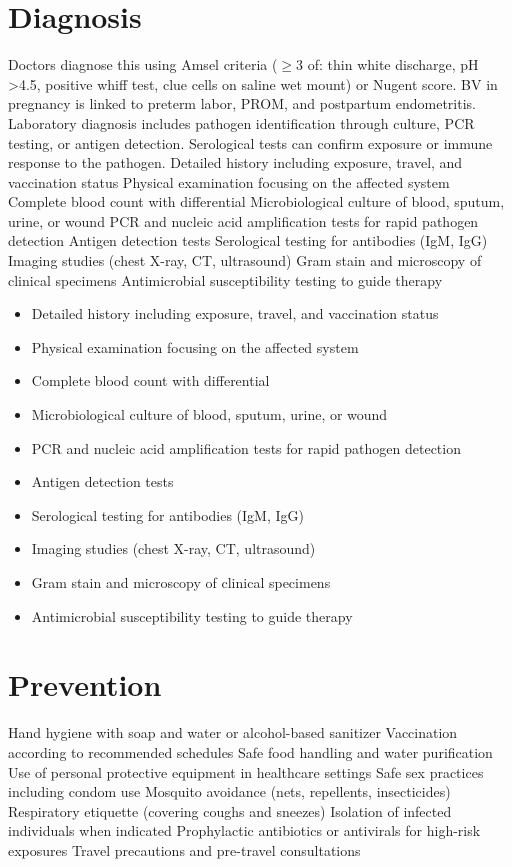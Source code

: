 \section{Diagnosis}
Doctors diagnose this using Amsel criteria ($\ge$3 of: thin white discharge, pH >4.5, positive whiff test, clue cells on saline wet mount) or Nugent score. BV in pregnancy is linked to preterm labor, PROM, and postpartum endometritis. Laboratory diagnosis includes pathogen identification through culture, PCR testing, or antigen detection. Serological tests can confirm exposure or immune response to the pathogen. Detailed history including exposure, travel, and vaccination status Physical examination focusing on the affected system Complete blood count with differential Microbiological culture of blood, sputum, urine, or wound PCR and nucleic acid amplification tests for rapid pathogen detection Antigen detection tests Serological testing for antibodies (IgM, IgG) Imaging studies (chest X-ray, CT, ultrasound) Gram stain and microscopy of clinical specimens Antimicrobial susceptibility testing to guide therapy

\begin{itemize}[noitemsep]
  \item Detailed history including exposure, travel, and vaccination status
  \item Physical examination focusing on the affected system
  \item Complete blood count with differential
  \item Microbiological culture of blood, sputum, urine, or wound
  \item PCR and nucleic acid amplification tests for rapid pathogen detection
  \item Antigen detection tests
  \item Serological testing for antibodies (IgM, IgG)
  \item Imaging studies (chest X-ray, CT, ultrasound)
  \item Gram stain and microscopy of clinical specimens
  \item Antimicrobial susceptibility testing to guide therapy
\end{itemize}
\section{Prevention}
Hand hygiene with soap and water or alcohol-based sanitizer Vaccination according to recommended schedules Safe food handling and water purification Use of personal protective equipment in healthcare settings Safe sex practices including condom use Mosquito avoidance (nets, repellents, insecticides) Respiratory etiquette (covering coughs and sneezes) Isolation of infected individuals when indicated Prophylactic antibiotics or antivirals for high-risk exposures Travel precautions and pre-travel consultations

